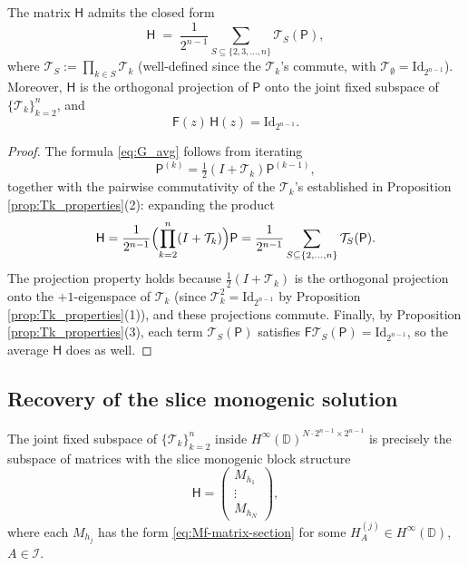 \documentclass[11pt]{amsart}
\begin{document}
\begin{prop}\label{prop:G-formula}
The matrix $\mathsf{H}$ admits the closed form
\begin{equation}\label{eq:G_avg}
\mathsf{H} \;=\; \frac{1}{2^{n-1}} \sum_{S \subseteq \{2, 3, \ldots, n\}} \mathcal T_S(\mathsf{P}),
\end{equation}
where $\mathcal T_S := \prod_{k \in S} \mathcal T_k$ (well-defined since the $\mathcal T_k$'s commute, with $\mathcal T_\emptyset = \mathrm{Id}_{2^{n-1}}$). Moreover, $\mathsf{H}$ is the orthogonal projection of $\mathsf{P}$ onto the joint fixed subspace of $\{\mathcal T_k\}_{k=2}^n$, and
\begin{equation}\label{eq:block_solution_identity_general}
\mathsf{F}(z)\, \mathsf{H}(z) = \mathrm{Id}_{2^{n-1}}.
\end{equation}
\end{prop}

\begin{proof}
The formula \eqref{eq:G_avg} follows from iterating
\[
\mathsf{P}^{(k)} = \tfrac12(I + \mathcal T_k) \mathsf{P}^{(k-1)},
\]
together with the pairwise commutativity of the $\mathcal T_k$'s established in Proposition \ref{prop:Tk_properties}(2): expanding the product
\[
\mathsf{H} = \frac{1}{2^{n-1}}\Bigl(\prod_{k=2}^n (I + \mathcal T_k)\Bigr) \mathsf{P} = \frac{1}{2^{n-1}}\sum_{S \subseteq \{2,\ldots,n\}} \mathcal T_S(\mathsf{P}).
\]
The projection property holds because $\frac12(I + \mathcal T_k)$ is the orthogonal projection onto the $+1$-eigenspace of $\mathcal T_k$ (since $\mathcal T_k^2 = \mathrm{Id}_{2^{n-1}}$ by Proposition \ref{prop:Tk_properties}(1)), and these projections commute. Finally, by Proposition \ref{prop:Tk_properties}(3), each term $\mathcal T_S(\mathsf{P})$ satisfies $\mathsf{F} \mathcal T_S(\mathsf{P}) = \mathrm{Id}_{2^{n-1}}$, so the average $\mathsf{H}$ does as well.
\end{proof}

\subsection{Recovery of the slice monogenic solution}

The joint fixed subspace of $\{\mathcal T_k\}_{k=2}^n$ inside $H^\infty(\mathbb{D})^{N\cdot 2^{n-1} \times 2^{n-1}}$ is precisely the subspace of matrices with the slice monogenic block structure
\[
\mathsf{H} = \begin{pmatrix} M_{h_1} \\ \vdots \\ M_{h_N} \end{pmatrix},
\]
where each $M_{h_j}$ has the form \eqref{eq:Mf-matrix-section} for some $H_A^{(j)} \in H^\infty(\mathbb{D})$, $A \in \mathcal I$.
\end{document}
